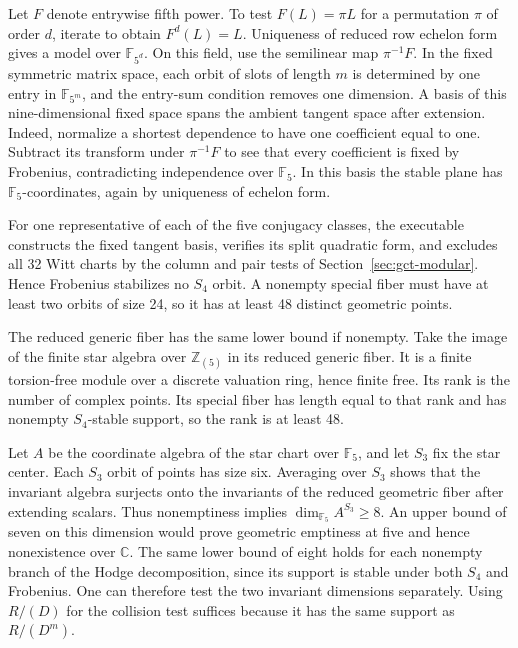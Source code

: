 Let \(F\) denote entrywise fifth power. To test \(F(L)=\pi L\)
for a permutation \(\pi\) of order \(d\), iterate to obtain
\(F^d(L)=L\). Uniqueness of reduced row echelon form gives a model
over \(\mathbb F_{5^d}\). On this field, use the semilinear map
\(\pi^{-1}F\). In the fixed symmetric matrix space, each orbit
of slots of length \(m\) is determined by one entry in
\(\mathbb F_{5^m}\), and the entry-sum condition removes one
dimension. A basis of this nine-dimensional fixed space spans
the ambient tangent space after extension. Indeed, normalize a
shortest dependence to have one coefficient equal to one.
Subtract its transform under \(\pi^{-1}F\) to see that every
coefficient is fixed by Frobenius, contradicting independence
over \(\mathbb F_5\). In this basis the stable plane has
\(\mathbb F_5\)-coordinates, again by uniqueness of echelon form.

For one representative of each of the five conjugacy classes,
the executable constructs the fixed tangent basis, verifies its
split quadratic form, and excludes all 32 Witt charts by the
column and pair tests of Section~\ref{sec:gct-modular}.
Hence Frobenius stabilizes no \(S_4\) orbit. A nonempty special
fiber must have at least two orbits of size 24, so it has at least
48 distinct geometric points.

The reduced generic fiber has the same lower bound if nonempty.
Take the image of the finite star algebra over \(\mathbb Z_{(5)}\)
in its reduced generic fiber. It is a finite torsion-free module
over a discrete valuation ring, hence finite free. Its rank is
the number of complex points. Its special fiber has length
equal to that rank and has nonempty \(S_4\)-stable support, so
the rank is at least 48.

Let \(A\) be the coordinate algebra of the star chart over
\(\mathbb F_5\), and let \(S_3\) fix the star center. Each
\(S_3\) orbit of points has size six. Averaging over \(S_3\)
shows that the invariant algebra surjects onto the invariants of
the reduced geometric fiber after extending scalars.
Thus nonemptiness implies \(\dim_{\mathbb F_5} A^{S_3}\ge8\).
An upper bound of seven on this dimension would prove geometric
emptiness at five and hence nonexistence over \(\mathbb C\).
The same lower bound of eight holds for each nonempty branch of
the Hodge decomposition, since its support is stable under both
\(S_4\) and Frobenius. One can therefore test the two invariant
dimensions separately. Using \(R/(D)\) for the collision test
suffices because it has the same support as \(R/(D^m)\).

